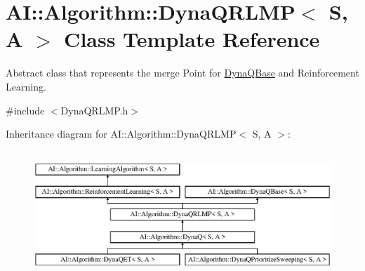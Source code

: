 \hypertarget{classAI_1_1Algorithm_1_1DynaQRLMP}{\section{A\+I\+:\+:Algorithm\+:\+:Dyna\+Q\+R\+L\+M\+P$<$ S, A $>$ Class Template Reference}
\label{classAI_1_1Algorithm_1_1DynaQRLMP}
}


Abstract class that represents the merge Point for \hyperlink{classAI_1_1Algorithm_1_1DynaQBase}{Dyna\+Q\+Base} and Reinforcement Learning.  




{\ttfamily \#include $<$Dyna\+Q\+R\+L\+M\+P.\+h$>$}

Inheritance diagram for A\+I\+:\+:Algorithm\+:\+:Dyna\+Q\+R\+L\+M\+P$<$ S, A $>$\+:\begin{figure}[H]
\begin{center}
\leavevmode
\includegraphics[height=4.794520cm]{classAI_1_1Algorithm_1_1DynaQRLMP}
\end{center}
\end{figure}
